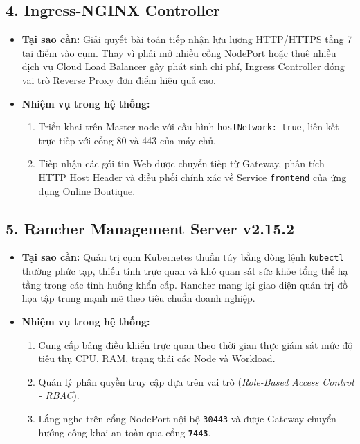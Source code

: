 \subsection{4. Ingress-NGINX Controller}
\begin{itemize}
    \item \textbf{Tại sao cần:} Giải quyết bài toán tiếp nhận lưu lượng HTTP/HTTPS tầng 7 tại điểm vào cụm. Thay vì phải mở nhiều cổng NodePort hoặc thuê nhiều dịch vụ Cloud Load Balancer gây phát sinh chi phí, Ingress Controller đóng vai trò Reverse Proxy đơn điểm hiệu quả cao.
    \item \textbf{Nhiệm vụ trong hệ thống:}
    \begin{enumerate}
        \item Triển khai trên Master node với cấu hình \texttt{hostNetwork: true}, liên kết trực tiếp với cổng 80 và 443 của máy chủ.
        \item Tiếp nhận các gói tin Web được chuyển tiếp từ Gateway, phân tích HTTP Host Header và điều phối chính xác về Service \texttt{frontend} của ứng dụng Online Boutique.
    \end{enumerate}
\end{itemize}

\subsection{5. Rancher Management Server v2.15.2}
\begin{itemize}
    \item \textbf{Tại sao cần:} Quản trị cụm Kubernetes thuần túy bằng dòng lệnh \texttt{kubectl} thường phức tạp, thiếu tính trực quan và khó quan sát sức khỏe tổng thể hạ tầng trong các tình huống khẩn cấp. Rancher mang lại giao diện quản trị đồ họa tập trung mạnh mẽ theo tiêu chuẩn doanh nghiệp.
    \item \textbf{Nhiệm vụ trong hệ thống:}
    \begin{enumerate}
        \item Cung cấp bảng điều khiển trực quan theo thời gian thực giám sát mức độ tiêu thụ CPU, RAM, trạng thái các Node và Workload.
        \item Quản lý phân quyền truy cập dựa trên vai trò (\textit{Role-Based Access Control - RBAC}).
        \item Lắng nghe trên cổng NodePort nội bộ \texttt{30443} và được Gateway chuyển hướng công khai an toàn qua cổng \textbf{\texttt{7443}}.
    \end{enumerate}
\end{itemize}

